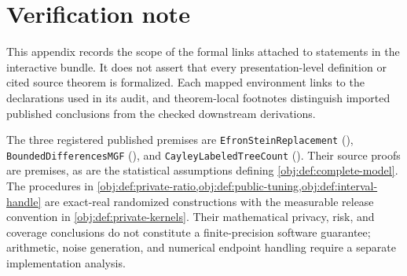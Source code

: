\section{Verification note}

This appendix records the scope of the formal links attached to statements in the interactive bundle. It does not assert that every presentation-level definition or cited source theorem is formalized. Each mapped environment links to the declarations used in its audit, and theorem-local footnotes distinguish imported published conclusions from the checked downstream derivations.

The three registered published premises are \texttt{EfronSteinReplacement} (\citet[Theorem 3.1, replacement-copy form, p.~54]{BoucheronLugosiMassart2013}), \texttt{BoundedDifferencesMGF} (\citet[Theorem 6.2, displayed log-mgf conclusion in its proof, p.~167]{BoucheronLugosiMassart2013}), and \texttt{CayleyLabeledTreeCount} (\citet[Section 5.6, Theorem 5.40]{KellerTrotterAppliedCombinatorics}). Their source proofs are premises, as are the statistical assumptions defining \cref{obj:def:complete-model}. The procedures in \cref{obj:def:private-ratio,obj:def:public-tuning,obj:def:interval-handle} are exact-real randomized constructions with the measurable release convention in \cref{obj:def:private-kernels}. Their mathematical privacy, risk, and coverage conclusions do not constitute a finite-precision software guarantee; arithmetic, noise generation, and numerical endpoint handling require a separate implementation analysis.
